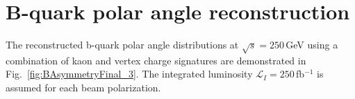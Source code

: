 

\section*{B-quark polar angle reconstruction}

The reconstructed b-quark polar angle distributions at $\sqrt{s} = 250$\,GeV using a combination of kaon and vertex charge signatures are demonstrated in Fig.~\ref{fig:BAsymmetryFinal_3}. The integrated luminosity $\mathcal{L}_I = 250$\,fb$^{-1}$ is assumed for each beam polarization.
\begin{center}\vspace{0.5cm}


\end{center}
